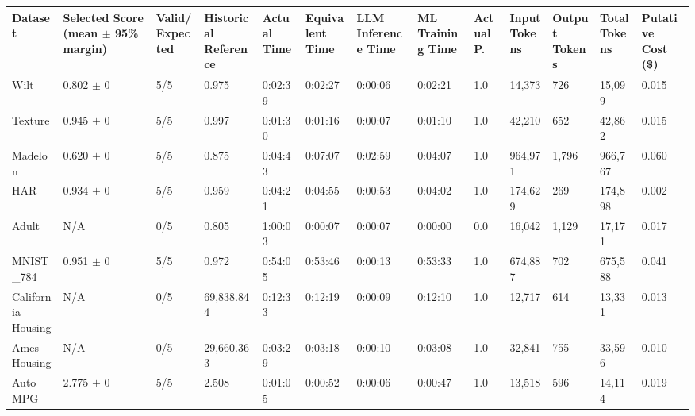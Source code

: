 \begin{tabular}{lllllllllllll}
\hline
Dataset & Selected Score (mean \ensuremath{\pm} 95\% margin) & Valid/Expected & Historical Reference & Actual Time & Equivalent Time & LLM Inference Time & ML Training Time & Actual P. & Input Tokens & Output Tokens & Total Tokens & Putative Cost (\$) \\
\hline
Wilt & 0.802 \ensuremath{\pm} 0 & 5/5 & 0.975 & 0:02:39 & 0:02:27 & 0:00:06 & 0:02:21 & 1.0 & 14,373 & 726 & 15,099 & 0.015 \\
Texture & 0.945 \ensuremath{\pm} 0 & 5/5 & 0.997 & 0:01:30 & 0:01:16 & 0:00:07 & 0:01:10 & 1.0 & 42,210 & 652 & 42,862 & 0.015 \\
Madelon & 0.620 \ensuremath{\pm} 0 & 5/5 & 0.875 & 0:04:43 & 0:07:07 & 0:02:59 & 0:04:07 & 1.0 & 964,971 & 1,796 & 966,767 & 0.060 \\
HAR & 0.934 \ensuremath{\pm} 0 & 5/5 & 0.959 & 0:04:21 & 0:04:55 & 0:00:53 & 0:04:02 & 1.0 & 174,629 & 269 & 174,898 & 0.002 \\
Adult & N/A & 0/5 & 0.805 & 1:00:03 & 0:00:07 & 0:00:07 & 0:00:00 & 0.0 & 16,042 & 1,129 & 17,171 & 0.017 \\
MNIST\_784 & 0.951 \ensuremath{\pm} 0 & 5/5 & 0.972 & 0:54:05 & 0:53:46 & 0:00:13 & 0:53:33 & 1.0 & 674,887 & 702 & 675,588 & 0.041 \\
California Housing & N/A & 0/5 & 69,838.844 & 0:12:33 & 0:12:19 & 0:00:09 & 0:12:10 & 1.0 & 12,717 & 614 & 13,331 & 0.013 \\
Ames Housing & N/A & 0/5 & 29,660.363 & 0:03:29 & 0:03:18 & 0:00:10 & 0:03:08 & 1.0 & 32,841 & 755 & 33,596 & 0.010 \\
Auto MPG & 2.775 \ensuremath{\pm} 0 & 5/5 & 2.508 & 0:01:05 & 0:00:52 & 0:00:06 & 0:00:47 & 1.0 & 13,518 & 596 & 14,114 & 0.019 \\
\hline
\end{tabular}
